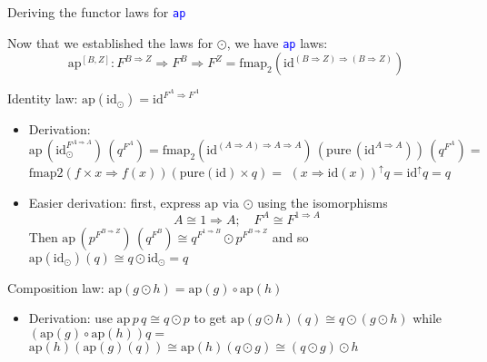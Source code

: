\documentclass[english]{beamer}
\begin{document}
\begin{frame}{Deriving the functor laws for \texttt{\textcolor{blue}{\footnotesize{}ap}} }

\vspace{-0.10cm}Now that we established the laws for $\odot$, we
have \texttt{\textcolor{blue}{\footnotesize{}ap}} laws:
\[
\text{ap}^{[B,Z]}:F^{B\Rightarrow Z}\Rightarrow F^{B}\Rightarrow F^{Z}=\text{fmap}_{2}\left(\text{id}^{\left(B\Rightarrow Z\right)\Rightarrow\left(B\Rightarrow Z\right)}\right)
\]

Identity law: $\text{ap}\left(\text{id}_{\odot}\right)=\text{id}^{F^{A}\Rightarrow F^{A}}$
\begin{itemize}
\item Derivation:{\footnotesize{} $\text{ap}\,(\text{id}_{\odot}^{F^{A\Rightarrow A}})\,(q^{F^{A}})=\text{fmap}_{2}(\text{id}^{\left(A\Rightarrow A\right)\Rightarrow A\Rightarrow A})\,(\text{pure}\,(\text{id}^{A\Rightarrow A}))\,(q^{F^{A}})=$}
{\footnotesize{}$\text{fmap2}\left(f\times x\Rightarrow f(x)\right)\left(\text{pure}\left(\text{id}\right)\times q\right)=$
$\left(x\Rightarrow\text{id}(x)\right)^{\uparrow}q=\text{id}^{\uparrow}q=q$} 
\item Easier derivation: first, express {\footnotesize{}$\text{ap}$} via
$\odot$ using the isomorphisms{\footnotesize{}
\[
A\cong1\Rightarrow A;\quad F^{A}\cong F^{1\Rightarrow A}
\]
}Then {\footnotesize{}$\text{ap}\,(p^{F^{B\Rightarrow Z}})\,(q^{F^{B}})\cong q^{F^{1\Rightarrow B}}\odot p^{F^{B\Rightarrow Z}}$}
and so {\footnotesize{}$\text{ap}\left(\text{id}_{\odot}\right)\left(q\right)\cong q\odot\text{id}_{\odot}=q$}{\footnotesize \par}
\end{itemize}
Composition law: $\text{ap}\left(g\odot h\right)=\text{ap}\left(g\right)\circ\text{ap}\left(h\right)$
\begin{itemize}
\item Derivation: use $\text{ap}\,p\,q\cong q\odot p$ to get {\footnotesize{}$\text{ap}\left(g\odot h\right)\left(q\right)\cong q\odot\left(g\odot h\right)$}
while {\footnotesize{}$\left(\text{ap}\left(g\right)\circ\text{ap}\left(h\right)\right)q=$
$\text{ap}\left(h\right)\left(\text{ap}\left(g\right)\left(q\right)\right)\cong\text{ap}\left(h\right)\left(q\odot g\right)\cong\left(q\odot g\right)\odot h$}{\footnotesize \par}
\end{itemize}
\end{frame}
\end{document}
